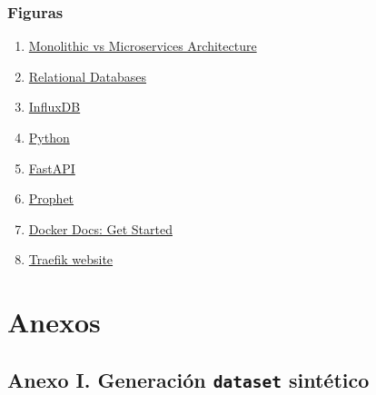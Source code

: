\documentclass[a4paper, oneside, 12pt]{book}
\begin{document}
	\vspace{20px}
	
	\subsection*{Figuras}

	\begin{enumerate}
		
		\item
		\label{bib_img: microservice architecture}
		\href{https://xbsoftware.com/blog/microservices-vs-monolithic-architecture/}{Monolithic vs Microservices Architecture}
		
		\item
		\label{bib_img: example sql}
		\href{https://xbsoftware.com/blog/main-types-of-database-management-systems/}{Relational Databases}
		
		\item
		\label{bib_img: influxdb logo}
		\href{https://www.influxdata.com/}{InfluxDB}
		
		\item
		\label{bib_img: python logo}
		\href{https://www.python.org/}{Python}
		
		\item
		\label{bib_img: fastapi logo}
		\href{https://fastapi.tiangolo.com/}{FastAPI}
		
		\item
		\label{bib_img: prophet logo}
		\href{https://facebook.github.io/prophet/}{Prophet}
		
		\item
		\label{bib_img: docker architecture}
		\href{https://docs.docker.com/get-started/overview/}{Docker Docs: Get Started}
		
		\item
		\label{bib_img: traefik capture}
		\href{https://traefik.io/traefik/}{Traefik website}
		
	\end{enumerate}
	
	\pagebreak
	
	\chapter*{Anexos}
	
	\section*{Anexo I. Generación \texttt{dataset} sintético}
	\label{sec: anexo 1 dataset}
	
\end{document}
